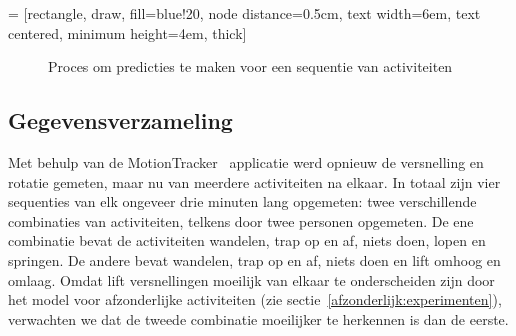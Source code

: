 \documentclass{article}
\begin{document}
 = [rectangle, draw, fill=blue!20, node distance=0.5cm, text width=6em, text centered, minimum height=4em, thick]
\begin{figure}[H]
\begin{center}
\end{center}
\caption{Proces om predicties te maken voor een sequentie van activiteiten}
\label{fig:proces:sequenties}
\end{figure}

\subsection{Gegevensverzameling}
\label{seq:gegevens}

Met behulp van de MotionTracker~\cite{meert and schietgat:motiontracker} applicatie werd opnieuw de versnelling en rotatie gemeten, maar nu van meerdere activiteiten na elkaar. In totaal zijn vier sequenties van elk ongeveer drie minuten lang opgemeten: twee verschillende combinaties van activiteiten, telkens door twee personen opgemeten. De ene combinatie bevat de activiteiten wandelen, trap op en af, niets doen, lopen en springen. De andere bevat wandelen, trap op en af, niets doen en lift omhoog en omlaag. Omdat lift versnellingen moeilijk van elkaar te onderscheiden zijn door het model voor afzonderlijke activiteiten (zie sectie~\ref{afzonderlijk:experimenten}), verwachten we dat de tweede combinatie moeilijker te herkennen is dan de eerste.
\end{document}
